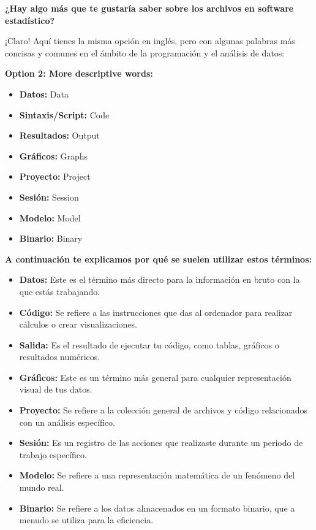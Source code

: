 \documentclass[
  stu,
  floatsintext,
  longtable,
  a4paper,
  nolmodern,
  notxfonts,
  notimes,
  12pt,
  colorlinks=true,linkcolor=blue,citecolor=blue,urlcolor=blue]{apa7}
\providecommand{\tightlist}{%
  \setlength{\itemsep}{0pt}\setlength{\parskip}{0pt}}
\begin{document}
\textbf{¿Hay algo más que te gustaría saber sobre los archivos en
software estadístico?}

¡Claro! Aquí tienes la misma opción en inglés, pero con algunas palabras
más concisas y comunes en el ámbito de la programación y el análisis de
datos:

\textbf{Option 2: More descriptive words:}

\begin{itemize}
\tightlist
\item
  \textbf{Datos:} Data
\item
  \textbf{Sintaxis/Script:} Code
\item
  \textbf{Resultados:} Output
\item
  \textbf{Gráficos:} Graphs
\item
  \textbf{Proyecto:} Project
\item
  \textbf{Sesión:} Session
\item
  \textbf{Modelo:} Model
\item
  \textbf{Binario:} Binary
\end{itemize}

\textbf{A continuación te explicamos por qué se suelen utilizar estos
términos:}

\begin{itemize}
\tightlist
\item
  \textbf{Datos:} Este es el término más directo para la información en
  bruto con la que estás trabajando.
\item
  \textbf{Código:} Se refiere a las instrucciones que das al ordenador
  para realizar cálculos o crear visualizaciones.
\item
  \textbf{Salida:} Es el resultado de ejecutar tu código, como tablas,
  gráficos o resultados numéricos.
\item
  \textbf{Gráficos:} Este es un término más general para cualquier
  representación visual de tus datos.
\item
  \textbf{Proyecto:} Se refiere a la colección general de archivos y
  código relacionados con un análisis específico.
\item
  \textbf{Sesión:} Es un registro de las acciones que realizaste durante
  un periodo de trabajo específico.
\item
  \textbf{Modelo:} Se refiere a una representación matemática de un
  fenómeno del mundo real.
\item
  \textbf{Binario:} Se refiere a los datos almacenados en un formato
  binario, que a menudo se utiliza para la eficiencia.
\end{itemize}
\end{document}
